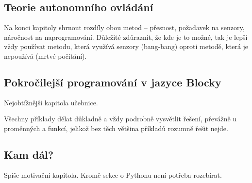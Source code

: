 \subsection{Teorie autonomního ovládání}
Na konci kapitoly shrnout rozdíly obou metod -- přesnost, požadavek na senzory, náročnost na naprogramování. Důležité zdůraznit, že kde je to možné, tak je lepší vždy používat metodu, která využívá senzory (bang-bang) oproti metodě, která je nepoužívá (mrtvé počítání).

\subsection{Pokročilejší programování v jazyce Blocky}
Nejobtížnější kapitola učebnice.

Všechny příklady dělat důkladně a vždy podrobně vysvětlit řešení, převážně u proměnných a funkcí, jelikož bez těch většina příkladů rozumně řešit nejde.

\subsection{Kam dál?}
Spíše motivační kapitola. Kromě sekce o Pythonu není potřeba rozebírat.

\cleardoublepage

\nocite{*}
\printbibliography[title={Seznam použitých a doporučených zdrojů}]


